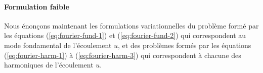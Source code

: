 
\paragraph{Formulation faible}\label{sec:stokes-fourier-weak}
Nous énonçons maintenant les formulations variationnelles du problème
formé par les équations (\ref{eq:fourier-fund-1}) et
(\ref{eq:fourier-fund-2}) qui correspondent au mode fondamental de
l'écoulement $u$, et des problèmes formés par les équations
(\ref{eq:fourier-harm-1}) à (\ref{eq:fourier-harm-3}) qui
correspondent à chacune des harmoniques de l'écoulement $u$.

